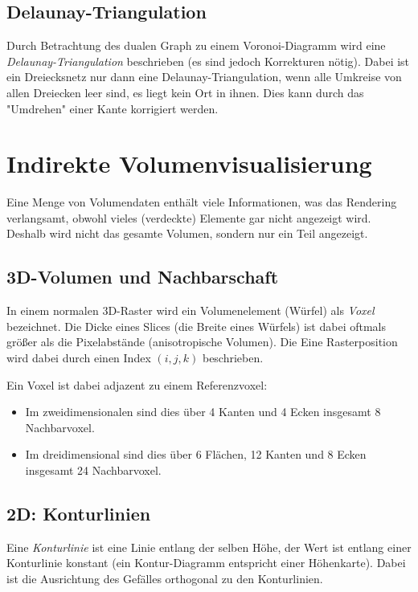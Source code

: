 		\subsection{Delaunay-Triangulation}
			Durch Betrachtung des dualen Graph zu einem Voronoi-Diagramm wird eine \emph{Delaunay-Triangulation} beschrieben (es sind jedoch \mglw Korrekturen nötig). Dabei ist ein Dreiecksnetz nur dann eine Delaunay-Triangulation, wenn alle Umkreise von allen Dreiecken leer sind, \dh es liegt kein Ort in ihnen. Dies kann durch das "Umdrehen" einer Kante korrigiert werden.

	\section{Indirekte Volumenvisualisierung}
		Eine Menge von Volumendaten enthält viele Informationen, was das Rendering verlangsamt, obwohl vieles (\zB verdeckte) Elemente gar nicht angezeigt wird. Deshalb wird \iA nicht das gesamte Volumen, sondern nur ein Teil angezeigt.

		\subsection{3D-Volumen und Nachbarschaft}
			In einem normalen 3D-Raster wird ein Volumenelement (Würfel) als \emph{Voxel} bezeichnet. Die Dicke eines Slices (\dh die Breite eines Würfels) ist dabei oftmals größer als die Pixelabstände (anisotropische Volumen). Die Eine Rasterposition wird dabei durch einen Index \( (i, j, k) \) beschrieben.
			
			Ein Voxel ist dabei adjazent zu einem Referenzvoxel:
			\begin{itemize}
				\item Im zweidimensionalen sind dies über \num{4} Kanten und \num{4} Ecken insgesamt \num{8} Nachbarvoxel.
				\item Im dreidimensional sind dies über \num{6} Flächen, \num{12} Kanten und \num{8} Ecken insgesamt \num{24} Nachbarvoxel.
			\end{itemize}

		\subsection{2D: Konturlinien}
			Eine \emph{Konturlinie} ist eine Linie entlang der selben Höhe, \dh der Wert ist entlang einer Konturlinie konstant (\dh ein Kontur-Diagramm entspricht einer Höhenkarte). Dabei ist die Ausrichtung des Gefälles orthogonal zu den Konturlinien.

